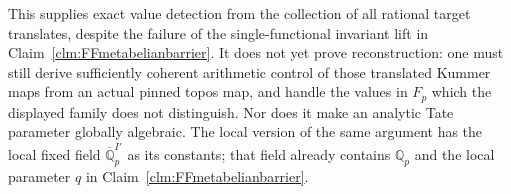 This supplies exact value detection
from the collection of all rational
target translates, despite the
failure of the single-functional
invariant lift in
Claim~\ref{clm:FFmetabelianbarrier}.
It does not yet prove reconstruction:
one must still derive sufficiently
coherent arithmetic control of those
translated Kummer maps from an
actual pinned topos map, and handle
the values in \(F_p\) which the
displayed family does not distinguish.
Nor does it make an analytic Tate
parameter globally algebraic. The
local version of the same argument
has the local fixed field
\(\overline{\mathbb Q}_p^{I'}\)
as its constants; that field already
contains \(\mathbb Q_p\) and the
local parameter \(q\) in
Claim~\ref{clm:FFmetabelianbarrier}.
